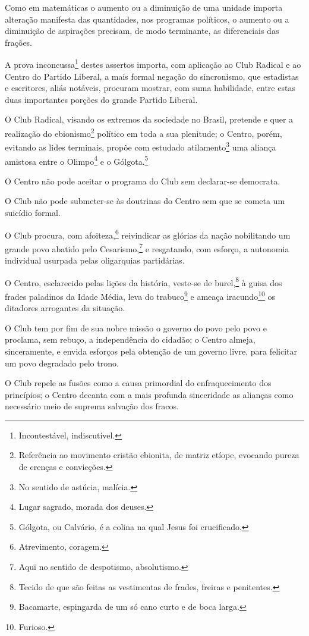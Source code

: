 Como em matemáticas o aumento ou a diminuição de uma unidade importa
alteração manifesta das quantidades, nos programas políticos, o aumento
ou a diminuição de aspirações precisam, de modo terminante, as
diferenciais das frações.

A prova inconcussa\footnote{Incontestável, indiscutível.} destes
assertos importa, com aplicação ao Club Radical e ao Centro do Partido
Liberal, a mais formal negação do sincronismo, que estadistas e
escritores, aliás notáveis, procuram mostrar, com suma habilidade, entre
estas duas importantes porções do grande Partido Liberal.

O Club Radical, visando os extremos da sociedade no Brasil, pretende e
quer a realização do ebionismo\footnote{Referência ao movimento
  cristão ebionita, de matriz etíope, evocando pureza de crenças e
  convicções.} político em toda a sua plenitude; o Centro, porém,
evitando as lides terminais, propõe com estudado atilamento\footnote{
  No sentido de astúcia, malícia.} uma aliança amistosa entre o
Olimpo\footnote{Lugar sagrado, morada dos deuses.} e o
Gólgota.\footnote{Gólgota, ou Calvário, é a colina na qual Jesus foi
  crucificado.}

O Centro não pode aceitar o programa do Club sem declarar-se democrata.

O Club não pode submeter-se às doutrinas do Centro sem que se cometa um
suicídio formal.

O Club procura, com afoiteza,\footnote{Atrevimento, coragem.}
reivindicar as glórias da nação nobilitando um grande povo abatido pelo
Cesarismo,\footnote{Aqui no sentido de despotismo, absolutismo.} e
resgatando, com esforço, a autonomia individual usurpada pelas
oligarquias partidárias.

O Centro, esclarecido pelas lições da história, veste-se de
burel,\footnote{Tecido de que são feitas as vestimentas de frades,
  freiras e penitentes.} à guisa dos frades paladinos da Idade Média,
leva do trabuco\footnote{Bacamarte, espingarda de um só cano curto e
  de boca larga.} e ameaça iracundo\footnote{Furioso.} os ditadores
arrogantes da situação.

O Club tem por fim de sua nobre missão o governo do povo pelo povo e
proclama, sem rebuço, a independência do cidadão; o Centro almeja,
sinceramente, e envida esforços pela obtenção de um governo livre, para
felicitar um povo degradado pelo trono.

O Club repele as fusões como a causa primordial do enfraquecimento dos
princípios; o Centro decanta com a mais profunda sinceridade as alianças
como necessário meio de suprema salvação dos fracos.

